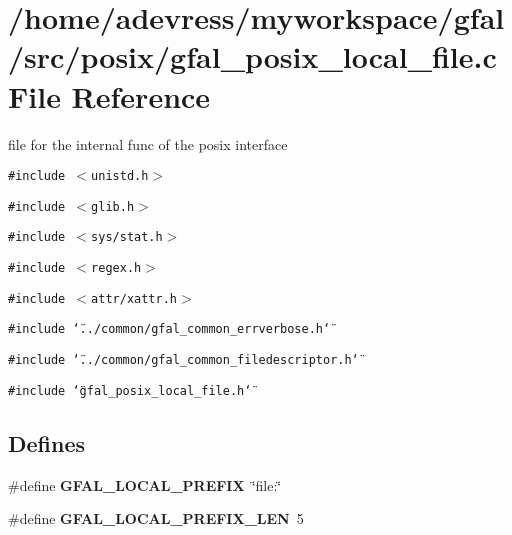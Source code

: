 \section{/home/adevress/myworkspace/gfal/src/posix/gfal\_\-posix\_\-local\_\-file.c File Reference}
\label{gfal__posix__local__file_8c}
file for the internal func of the posix interface 

{\tt \#include $<$unistd.h$>$}\par
{\tt \#include $<$glib.h$>$}\par
{\tt \#include $<$sys/stat.h$>$}\par
{\tt \#include $<$regex.h$>$}\par
{\tt \#include $<$attr/xattr.h$>$}\par
{\tt \#include \char`\"{}../common/gfal\_\-common\_\-errverbose.h\char`\"{}}\par
{\tt \#include \char`\"{}../common/gfal\_\-common\_\-filedescriptor.h\char`\"{}}\par
{\tt \#include \char`\"{}gfal\_\-posix\_\-local\_\-file.h\char`\"{}}\par
\subsection*{Defines}
\begin{CompactItemize}
\item 
\#define \textbf{GFAL\_\-LOCAL\_\-PREFIX}~\char`\"{}file:\char`\"{}\label{gfal__posix__local__file_8c_72e3f23638773071a6db4d9a354ccfdb}

\item 
\#define \textbf{GFAL\_\-LOCAL\_\-PREFIX\_\-LEN}~5\label{gfal__posix__local__file_8c_ff19b1b9a266e6b8e76d0262b53d7a1a}

\end{CompactItemize}
